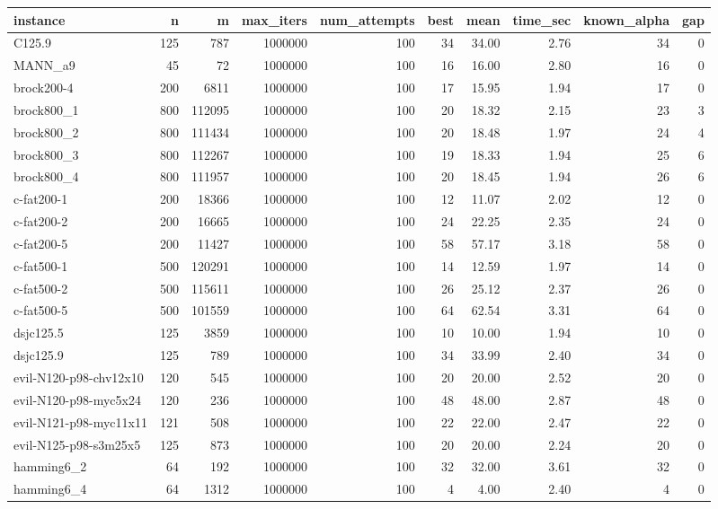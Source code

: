 \begin{tabular}{lrrrrrrrrr}
\toprule
instance & n & m & max\_iters & num\_attempts & best & mean & time\_sec & known\_alpha & gap \\
\midrule
C125.9 & 125 & 787 & 1000000 & 100 & 34 & 34.00 & 2.76 & 34 & 0 \\
MANN\_a9 & 45 & 72 & 1000000 & 100 & 16 & 16.00 & 2.80 & 16 & 0 \\
brock200-4 & 200 & 6811 & 1000000 & 100 & 17 & 15.95 & 1.94 & 17 & 0 \\
brock800\_1 & 800 & 112095 & 1000000 & 100 & 20 & 18.32 & 2.15 & 23 & 3 \\
brock800\_2 & 800 & 111434 & 1000000 & 100 & 20 & 18.48 & 1.97 & 24 & 4 \\
brock800\_3 & 800 & 112267 & 1000000 & 100 & 19 & 18.33 & 1.94 & 25 & 6 \\
brock800\_4 & 800 & 111957 & 1000000 & 100 & 20 & 18.45 & 1.94 & 26 & 6 \\
c-fat200-1 & 200 & 18366 & 1000000 & 100 & 12 & 11.07 & 2.02 & 12 & 0 \\
c-fat200-2 & 200 & 16665 & 1000000 & 100 & 24 & 22.25 & 2.35 & 24 & 0 \\
c-fat200-5 & 200 & 11427 & 1000000 & 100 & 58 & 57.17 & 3.18 & 58 & 0 \\
c-fat500-1 & 500 & 120291 & 1000000 & 100 & 14 & 12.59 & 1.97 & 14 & 0 \\
c-fat500-2 & 500 & 115611 & 1000000 & 100 & 26 & 25.12 & 2.37 & 26 & 0 \\
c-fat500-5 & 500 & 101559 & 1000000 & 100 & 64 & 62.54 & 3.31 & 64 & 0 \\
dsjc125.5 & 125 & 3859 & 1000000 & 100 & 10 & 10.00 & 1.94 & 10 & 0 \\
dsjc125.9 & 125 & 789 & 1000000 & 100 & 34 & 33.99 & 2.40 & 34 & 0 \\
evil-N120-p98-chv12x10 & 120 & 545 & 1000000 & 100 & 20 & 20.00 & 2.52 & 20 & 0 \\
evil-N120-p98-myc5x24 & 120 & 236 & 1000000 & 100 & 48 & 48.00 & 2.87 & 48 & 0 \\
evil-N121-p98-myc11x11 & 121 & 508 & 1000000 & 100 & 22 & 22.00 & 2.47 & 22 & 0 \\
evil-N125-p98-s3m25x5 & 125 & 873 & 1000000 & 100 & 20 & 20.00 & 2.24 & 20 & 0 \\
hamming6\_2 & 64 & 192 & 1000000 & 100 & 32 & 32.00 & 3.61 & 32 & 0 \\
hamming6\_4 & 64 & 1312 & 1000000 & 100 & 4 & 4.00 & 2.40 & 4 & 0 \\

\end{tabular}
